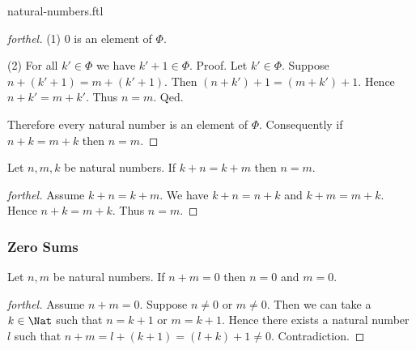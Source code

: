 \documentclass{naproche-library}
\begin{document}
\begin{smodule}{natural-numbers.ftl}
\begin{proof}[forthel]
    (1) $0$ is an element of $\Phi$.

    (2) For all $k' \in \Phi$ we have $k' + 1 \in \Phi$. \newline
    Proof.
      Let $k' \in \Phi$.
      Suppose $n + (k' + 1) = m + (k' + 1)$.
      Then $(n + k') + 1 = (m + k') + 1$.
      Hence $n + k' = m + k'$.
      Thus $n = m$.
    Qed.

    Therefore every natural number is an element of $\Phi$.
    Consequently if $n + k = m + k$ then $n = m$.
  \end{proof}

  \begin{corollary}[forthel,id=ARITHMETIC_03_8445946379632640]
    Let $n, m, k$ be natural numbers.
    If $k + n = k + m$ then $n = m$.
  \end{corollary}
  \begin{proof}[forthel]
    Assume $k + n = k + m$.
    We have $k + n = n + k$ and $k + m = m + k$.
    Hence $n + k = m + k$.
    Thus $n = m$.
  \end{proof}


  \subsubsection*{Zero Sums}

  \begin{proposition}[forthel,id=ARITHMETIC_03_3520602170195968]
    Let $n, m$ be natural numbers.
    If $n + m = 0$ then $n = 0$ and $m = 0$.
  \end{proposition}
  \begin{proof}[forthel]
    Assume $n + m = 0$.
    Suppose $n \neq 0$ or $m \neq 0$.
    Then we can take a $k \in \Nat$ such that $n = k + 1$ or $m = k + 1$.
    Hence there exists a natural number $l$ such that
    $n + m
      = l + (k + 1)
      = (l + k) + 1
      \neq 0$.
    Contradiction.
  \end{proof}
\end{smodule}
\end{document}
